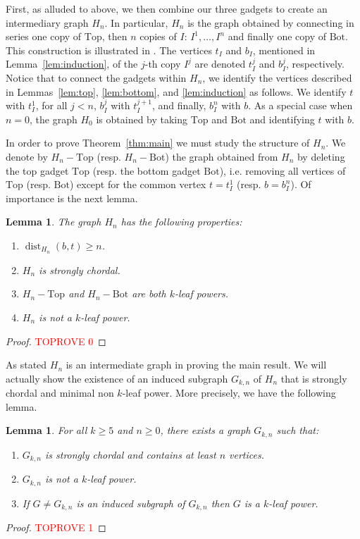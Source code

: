 \documentclass[11pt,letter]{article}
\newtheorem{lemma}[theorem]{Lemma}
\theoremstyle{remark}
\newcommand{\T}{\text{Top}}
\newcommand{\B}{\text{Bot}}
\DeclareMathOperator{\dist}{dist}
\begin{document}
First, as alluded to above, we then combine our three gadgets to create an intermediary graph $H_n$. In particular, $H_n$ is the graph obtained by connecting in series one copy of $\T$,
then $n$ copies of $I$: $I^1, \dots, I^n$ and finally one copy of $\B$.  
This construction is illustrated in .
The vertices $t_I$ and $b_I$, mentioned in Lemma~\ref{lem:induction}, of the $j$-th copy $I^j$ are denoted $t^j_I$ and $b^j_I$, respectively.
Notice that to connect the gadgets within $H_n$, we identify the vertices described in Lemmas~\ref{lem:top}, \ref{lem:bottom}, and \ref{lem:induction} as follows. We identify $t$ with $t^1_I$, for all $j < n$, $b^j_I$ with $t^{j+1}_I$, and finally, $b^n_I$ with $b$. As a special case when $n = 0$, the graph $H_0$ is obtained by taking $\T$ and $\B$ and identifying $t$ with $b$.

In order to prove Theorem~\ref{thm:main} we must study the structure of $H_n$. We denote by $H_n - \T$ (resp. $H_n - \B$) the graph obtained from $H_n$ by deleting the top gadget $\T$ (resp. the bottom gadget $\B$), i.e. removing all vertices of $\T$ (resp. $\B$) except for the common vertex $t = t_I^1$ (resp. $b = b_I^n$). Of importance is the next lemma.
\begin{lemma}\label{lem:Hn}
    The graph $H_n$ has the following properties:
    \begin{enumerate}
        \item $\dist_{H_n}(b,t) \geq n$. \label{cond:increasing}
        \item $H_n$ is strongly chordal. \label{cond:Str-Chordal}
        \item $H_n - \T$ and $H_n - \B$ are both $k$-leaf powers. \label{cond:Top/Bot}
        \item $H_n$ is not a $k$-leaf power. \label{cond:not-LP}
        \end{enumerate}
\end{lemma}
\begin{proof}\textcolor{red}{TOPROVE 0}\end{proof}

As stated $H_n$ is an intermediate graph in proving the main result. 
We will actually show the existence
of an induced subgraph $G_{k,n}$ of $H_n$
that is strongly chordal and minimal non $k$-leaf power.
More precisely, we have the following lemma.

\begin{lemma}\label{lem:Gn}
    For all $k\geq 5$ and $n\geq 0$, there exists a graph $G_{k,n}$ such that:
\begin{enumerate}
    \item $G_{k,n}$ is strongly chordal and contains at least $n$ vertices.
    \item $G_{k,n}$ is not a $k$-leaf power.
    \item If $G\neq G_{k,n}$ is an induced subgraph of $G_{k,n}$ then $G$ is a $k$-leaf power.
\end{enumerate}
\end{lemma}
\begin{proof}\textcolor{red}{TOPROVE 1}\end{proof}
\end{document}
